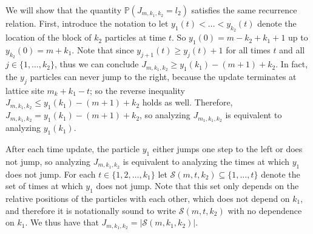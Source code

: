 \documentclass[12pt]{ximera}
\begin{document}
We will show that the quantity $\mathbb{P}(J_{m,k_1,k_2}=l_2)$ satisfies the same recurrence relation. First, introduce the notation to let $y_1(t)<\ldots< y_{k_2}(t)$ denote the location of the block of $k_2$ particles at time $t$. So $y_1(0)=m-k_2+k_1+1$ up to $y_{k_2}(0)=m+k_1$. Note that since $y_{j+1}(t) \geq y_j(t)+1$ for all times $t$ and all $j\in \{1,\ldots,k_2\}$, thus we can conclude $J_{m,k_1,k_2} \geq y_1(k_1)-(m+1)+k_2$. In fact, the $y_j$ particles can never jump to the right, because the update terminates at lattice site $m_k+k_1-t$; so the reverse inequality $J_{m,k_1,k_2} \leq y_1(k_1)-(m+1)+k_2$ holds as well. Therefore, $J_{m,k_1,k_2}=y_1(k_1)-(m+1)+k_2$, so analyzing $J_{m_1,k_1,k_2}$ is equivalent to analyzing $y_1(k_1)$.

After each time update, the particle $y_1$ either jumps one step to the left or does not jump, so analyzing $J_{m,k_1,k_2}$ is equivalent to analyzing the times at which $y_1$ does not jump. For each $t \in \{1,2,\ldots,k_1\}$ let $\mathcal{S}(m,t,k_2) \subseteq \{1,\ldots,t\}$ denote the set of times at which $y_1$ does not jump. Note that this set only depends on the relative positions of the particles with each other, which does not depend on $k_1$, and therefore it is notationally sound to write $\mathcal{S}(m,t,k_2)$ with no dependence on $k_1$. We thus have that $J_{m,k_1,k_2}= \vert \mathcal{S}(m,k_1,k_2)\vert$.
\end{document}
